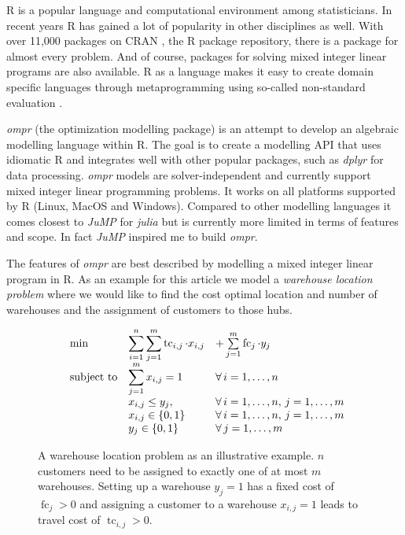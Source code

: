 \documentclass{optima}\usepackage[]{graphicx}\usepackage[]{color}
\begin{document}



\noindent
R \cite{r} is a popular language and computational environment among statisticians. In recent years R has gained a lot of popularity in other disciplines as well. With over 11,000 packages on CRAN \cite{cran}, the R package repository, there is a package for almost every problem. And of course, packages for solving mixed integer linear programs are also available. R as a language makes it easy to create domain specific languages through metaprogramming using so-called non-standard evaluation \cite{advancedr}.

\emph{ompr} (the optimization modelling package) \cite{ompr} is an attempt to develop an algebraic modelling language within R. The goal is to create a modelling API that uses idiomatic R and integrates well with other popular packages, such as \emph{dplyr} for data processing. \emph{ompr} models are solver-independent and currently support mixed integer linear programming problems. It works on all platforms supported by R (Linux, MacOS and Windows). Compared to other modelling languages it comes closest to \emph{JuMP} \cite{jump} for \emph{julia} but is currently more limited in terms of features and scope. In fact \emph{JuMP} inspired me to build \emph{ompr}.

The features of \emph{ompr} are best described by modelling a mixed integer linear program in R. As an example for this article we model a \emph{warehouse location problem} where we would like to find the cost optimal location and number of warehouses and the assignment of customers to those hubs.

\begin{figure}[h]
\begin{equation*}
\begin{array}{lll@{}}
\text{min}  & \displaystyle\sum\limits_{i=1}^{n}\sum\limits_{j=1}^{m}\operatorname{tc}_{i,j} \cdot x_{i, j} & +  \sum\limits_{j=1}^{m}\operatorname{fc}_{j} \cdot y_{j}\\
\text{subject to} & \displaystyle\sum\limits_{j=1}^{m}   x_{i, j} = 1  & \forall\,i=1 ,\ldots, n\\
                  & \displaystyle x_{i, j} \leq y_j,  & \forall\,i=1 ,\ldots, n,\,j=1 ,\ldots, m\\
                 &                                                x_{i,j} \in \{0,1\} &\forall\,i=1 ,\ldots, n,\,j=1 ,\ldots, m\\
                 &                                                y_{j} \in \{0,1\} &\forall\,j=1 ,\ldots, m
\end{array}
\end{equation*}
\caption{A warehouse location problem as an illustrative example. $n$ customers need to be assigned to exactly one of at most $m$ warehouses. Setting up a warehouse $y_j=1$ has a fixed cost of $\operatorname{fc}_j>0$ and assigning a customer to a warehouse $x_{i,j}=1$ leads to travel cost of $\operatorname{tc}_{i,j}>0$.}
\end{figure}
\end{document}
